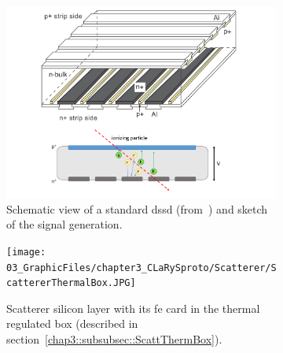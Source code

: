 \begin{figure}
\begin{subfigure}[t]{.5\textwidth}
\centering
\includegraphics[width=1\textwidth]{03_GraphicFiles/chapter3_CLaRySproto/Scatterer/DSSD_theory_1.pdf}
\caption{Schematic view of a standard \gls{dssd} (from~\cite{Takeda2008}) and sketch of the signal generation.}
\label{chap3::fig::dssdTHEO}
\end{subfigure}
\begin{subfigure}[t]{.5\textwidth}
\centering
\texttt{[image: 03\_GraphicFiles/chapter3\_CLaRySproto/Scatterer/ScattererThermalBox.JPG]}
\caption{Scatterer silicon layer with its \gls{fe} card in the thermal regulated box (described in section~\ref{chap3::subsubsec::ScattThermBox}).}
\label{chap3::fig::ScattPicture}
\end{subfigure}
\caption{}
\label{chap3::fig::scatterer}
\end{figure} 

